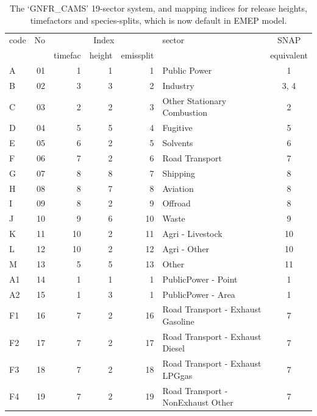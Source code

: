 \clearpage

%
%
\begin{table}[H]
\begin{small}
\caption{The `GNFR\_CAMS' 19-sector system, and mapping indices for release heights, timefactors and species-splits, which is now default in EMEP model. \label{tab:GNFRsectors}}
\begin{tabular}{lrrrrlc}
\hline
code & No  & \multicolumn{3}{c}{Index}      & sector & SNAP\\ \cline{3-5}
     &         & timefac  & height & emissplit  &        & equivalent \\
\hline
A &      01 &   1 &  1 &   1 &  Public Power  &  1 \\
B &      02 &   3 &  3 &   2 &  Industry  & 3, 4 \\
C &      03 &   2 &  2 &   3 &  Other Stationary Combustion & 2 \\
D &      04 &   5 &  5 &   4 &  Fugitive & 5 \\ %
E &      05 &   6 &  2 &   5 &  Solvents & 6 \\
F &      06 &   7 &  2 &   6 &  Road Transport & 7 \\
G &      07 &   8 &  8 &   7 &  Shipping & 8  \\ %
H &      08 &   8 &  7 &   8 &  Aviation & 8  \\
I &      09 &   8 &  2 &   9 &  Offroad & 8  \\
J &     10 &   9 &  6 &  10 &  Waste & 9 \\
K &     11 &  10 &  2 &  11 &  Agri - Livestock & 10 \\
L &     12 &  10 &  2 &  12 &  Agri - Other & 10 \\
M &     13 &   5 &  5 &  13 &  Other & 11 \\
A1 &    14 &   1 &  1 &   1 &  PublicPower - Point & 1 \\
A2 &    15 &   1 &  3 &   1 &  PublicPower - Area & 1 \\
F1 &    16 &   7 &  2 &  16 &  Road Transport - Exhaust Gasoline & 7  \\
F2 &    17 &   7 &  2 &  17 &  Road Transport - Exhaust Diesel& 7   \\
F3 &    18 &   7 &  2 &  18 &  Road Transport - Exhaust LPGgas & 7  \\
F4 &    19 &   7 &  2 &  19 &  Road Transport - NonExhaust Other& 7   \\
\hline
\end{tabular}
\end{small}
\end{table}


